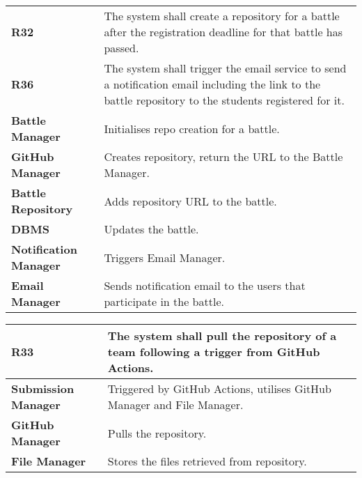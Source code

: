 \begin{table}[h!]
  \centering
  \begin{tabular}{lp{12cm}}
    \hline
    \textbf{R32} &  The system shall create a repository for a battle after the registration deadline for that battle has passed. \\
    \textbf{R36} &  The system shall trigger the email service to send a notification email including the link to the battle repository to the students registered for it.\\
    \hline
    \hline
    \textbf{Battle Manager} & Initialises repo creation for a battle. \\
    \textbf{GitHub Manager} & Creates repository, return the URL to the Battle Manager.\\
    \textbf{Battle Repository} & Adds repository URL to the battle.\\
    \textbf{DBMS} & Updates the battle. \\
    \textbf{Notification Manager} &  Triggers Email Manager.\\
    \textbf{Email Manager} &  Sends notification email to the users that participate in the battle.\\
    
    \hline
  \end{tabular}
\end{table}


\begin{table}[h!]
  \centering
  \begin{tabular}{lp{12cm}}
    \hline
    \textbf{R33} &  The system shall pull the repository of a team following a trigger from GitHub Actions. \\
    \hline
    \hline
    \textbf{Submission Manager} & Triggered by GitHub Actions, utilises GitHub Manager and File Manager. \\
    \textbf{GitHub Manager} & Pulls the repository.\\
    \textbf{File Manager} & Stores the files retrieved from repository.\\
    \hline
  \end{tabular}
\end{table}






